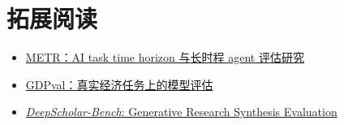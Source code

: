 \section{拓展阅读}

\begin{itemize}
    \item \href{https://metr.org/}{METR：AI task time horizon 与长时程 agent 评估研究}
    \item \href{https://openai.com/index/gdpval/}{GDPval：真实经济任务上的模型评估}
    \item \href{https://arxiv.org/search/?query=DeepScholar-Bench\&searchtype=all}{\emph{DeepScholar-Bench}: Generative Research Synthesis Evaluation}
\end{itemize}


